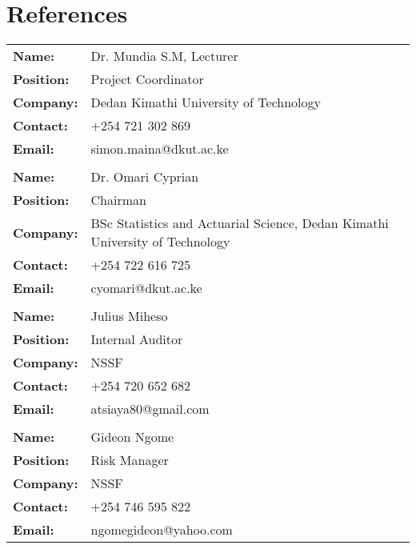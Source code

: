 \documentclass[11pt,a4paper,sans,english]{moderncv}        %
\begin{document}
\newpage
\section{References}

\begin{center}
	\begin{tabular}{p{6cm}p{8cm}}
		\textbf{Name:} & Dr. Mundia S.M, Lecturer\\
		\textbf{Position:} & Project  Coordinator\\
		\textbf{Company:} & Dedan Kimathi University of Technology \\
		\textbf{Contact:} & +254 721 302 869\\
		\textbf{Email:} & simon.maina@dkut.ac.ke \\
		\\
		\textbf{Name:} & Dr. Omari Cyprian \\
		\textbf{Position:} & Chairman \\
		\textbf{Company:} & BSc Statistics and Actuarial Science, Dedan Kimathi University of Technology \\
		\textbf{Contact:} & +254 722 616 725 \\
		\textbf{Email:} & cyomari@dkut.ac.ke \\
		\\
		\textbf{Name:} & Julius Miheso \\
		\textbf{Position:} & Internal Auditor \\
		\textbf{Company:} & NSSF \\
		\textbf{Contact:} & +254 720 652 682 \\
		\textbf{Email:} & atsiaya80@gmail.com \\
		\\
		\textbf{Name:} & Gideon Ngome \\
		\textbf{Position:} & Risk Manager \\
		\textbf{Company:} & NSSF \\
		\textbf{Contact:} & +254 746 595 822 \\
		\textbf{Email:} & ngomegideon@yahoo.com \\
		

	\end{tabular}
\end{center}
\end{document}
